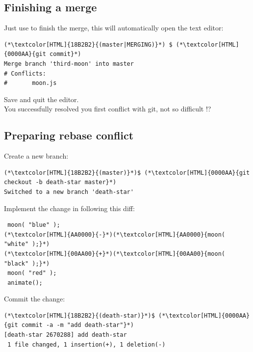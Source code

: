\subsection{Finishing a merge}
\begin{frame}[fragile]
  \subslidetitle

  Just use  to finish the merge, this will automatically open the text editor:
  \begin{lstlisting}
(*\textcolor[HTML]{18B2B2}{(master|MERGING)}*) $ (*\textcolor[HTML]{0000AA}{git commit}*)
Merge branch 'third-moon' into master
# Conflicts:
#       moon.js
\end{lstlisting}
  Save and quit the editor.
  \\
  \vspace{1em}
  You successfully resolved you first conflict with git, not so difficult !?

\end{frame}

\subsection{Preparing rebase conflict}
\begin{frame}[fragile]
  \subslidetitle

  Create a new  branch:
  \begin{lstlisting}
(*\textcolor[HTML]{18B2B2}{(master)}*)$ (*\textcolor[HTML]{0000AA}{git checkout -b death-star master}*)
Switched to a new branch 'death-star'
\end{lstlisting}

  Implement the change in  following this diff:

  \begin{lstlisting}
 moon( "blue" );
(*\textcolor[HTML]{AA0000}{-}*)(*\textcolor[HTML]{AA0000}{moon( "white" );}*)
(*\textcolor[HTML]{00AA00}{+}*)(*\textcolor[HTML]{00AA00}{moon( "black" );}*)
 moon( "red" );
 animate();
\end{lstlisting}

  Commit the change:
  \begin{lstlisting}
(*\textcolor[HTML]{18B2B2}{(death-star)}*)$ (*\textcolor[HTML]{0000AA}{git commit -a -m "add death-star"}*)
[death-star 2670288] add death-star
 1 file changed, 1 insertion(+), 1 deletion(-)
\end{lstlisting}
\end{frame}

